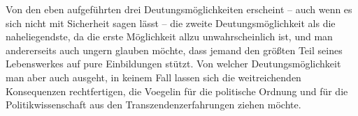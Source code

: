 Von den eben aufgeführten drei Deutungsmöglichkeiten erscheint -- auch wenn es
sich nicht mit Sicherheit sagen lässt -- die zweite Deutungsmöglichkeit als die
naheliegendste, da die erste Möglichkeit allzu unwahrscheinlich ist, und man
andererseits auch ungern glauben möchte, dass jemand den größten Teil seines
Lebenswerkes auf pure Einbildungen stützt. Von welcher Deutungsmöglichkeit man
aber auch ausgeht, in keinem Fall lassen sich die weitreichenden Konsequenzen
rechtfertigen, die Voegelin für die politische Ordnung und für die
Politikwissenschaft aus den Transzendenzerfahrungen ziehen möchte.



















